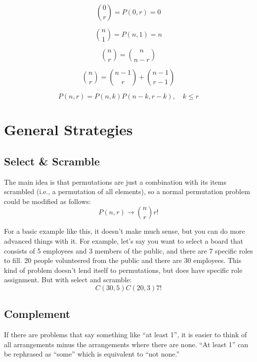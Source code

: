 \documentclass{article}
\begin{document}
    \begin{equation}
        {0 \choose r} = P(0, r) = 0
    \end{equation}
    
    \begin{equation}
        {n \choose 1} = P(n, 1) = n
    \end{equation}
    
    \begin{equation}
        {n \choose r} = {n \choose n - r}
    \end{equation}

    \begin{equation}
        {n \choose r} = {n - 1 \choose r} + {n - 1 \choose r - 1}
    \end{equation}

    \begin{equation}
        P(n, r) = P(n, k)P(n - k, r - k), \quad k \leq r
    \end{equation}

    \section{General Strategies}

    \subsection{Select \& Scramble}

    The main idea is that permutations are just a combination with its items scrambled (i.e., a permutation of all elements), so a normal permutation problem could be modified as follows: $$
        P(n, r) \to {n \choose r}r!
    $$

    For a basic example like this, it doesn't make much sense, but you can do more advanced things with it. For example, let's say you want to select a board that consists of 5 employees and 3 members of the public, and there are 7 specific roles to fill. 20 people volunteered from the public and there are 30 employees. This kind of problem doesn't lend itself to permutations, but does have specific role assignment. But with select and scramble: $$
        C(30, 5)C(20, 3)7!
    $$

    \subsection{Complement}

    If there are problems that say something like ``at least 1'', it is easier to think of all arrangements minus the arrangements where there are none. ``At least 1'' can be rephrased as ``some'' which is equivalent to ``not none.''
\end{document}
